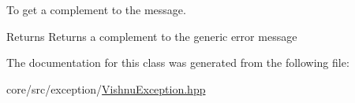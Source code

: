 To get a complement to the message. 

\begin{DoxyReturn}{Returns}
Returns a complement to the generic error message 
\end{DoxyReturn}


The documentation for this class was generated from the following file:\begin{DoxyCompactItemize}
\item 
core/src/exception/\hyperlink{VishnuException_8hpp}{VishnuException.hpp}\end{DoxyCompactItemize}
